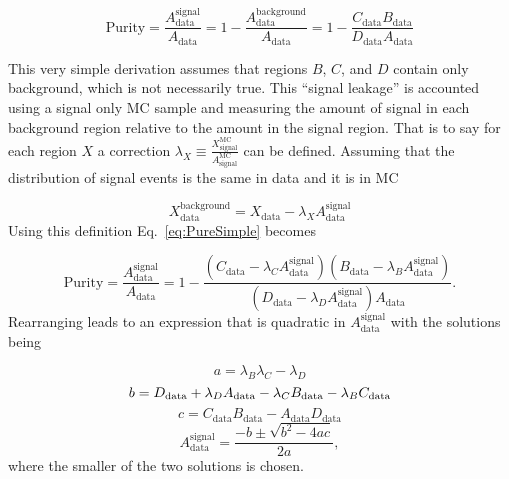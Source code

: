 \begin{equation}
 \label{eq:PureSimple}
 \mathrm{Purity} = \frac{A_{\mathrm{data}}^{\mathrm{signal}}}{A_{\mathrm{data}}} = 1-\frac{A_{\mathrm{data}}^{\mathrm{background}}}{A_{\mathrm{data}}} =1- \frac{C_{\mathrm{data}}B_{\mathrm{data}}}{D_{\mathrm {data}}A_{\mathrm {data}}}
\end{equation}
\noindent

This very simple derivation assumes that regions $B$, $C$, and $D$ contain only background, which is not necessarily true.  
This ``signal leakage'' is accounted using a signal only MC sample and measuring the amount of signal in each background region relative to the amount in the signal region.  
That is to say for each region $X$ a correction $\lambda_X\equiv\frac{X_{\mathrm{signal}}^{\mathrm{MC}}}{A_{\mathrm{signal}}^{\mathrm{MC}}}$ can be defined.  
Assuming that the distribution of signal events is the same in data and it is in MC

\begin{equation}
 X_{\mathrm{data}}^{\mathrm{background}} = X_{\mathrm{data}} - \lambda_XA_{\mathrm{data}}^{\mathrm{signal}}
\end{equation}
\noindent
Using this definition Eq.~\ref{eq:PureSimple} becomes

\begin{equation}
 \label{eq:PureLeakage}
 \mathrm{Purity} = \frac{A_{\mathrm{data}}^{\mathrm{signal}}}{A_{\mathrm{data}}} = 1-\frac{\left(C_{\mathrm{data}}-\lambda_CA_{\mathrm{data}}^{\mathrm{signal}}\right)\left(B_{\mathrm{data}}-\lambda_BA_{\mathrm{data}}^{\mathrm{signal}}\right)}{\left(D_{\mathrm{data}}-\lambda_DA_{\mathrm{data}}^{\mathrm{signal}}\right)A_{\mathrm{data}}}.  
\end{equation}
\noindent
Rearranging leads to an expression that is quadratic in $A_{\mathrm{data}}^{\mathrm{signal}}$ with the solutions being

\begin{equation}
 a=\lambda_B\lambda_C-\lambda_D 
\end{equation}
\begin{equation}
 b=D_{\mathrm{data}}+\lambda_DA_{\mathrm{data}}-\lambda_CB_{\mathrm{data}}-\lambda_BC_{\mathrm{data}} \\
\end{equation}
\begin{equation}
 c=C_{\mathrm{data}}B_{\mathrm{data}}-A_{\mathrm{data}}D_{\mathrm{data}}
\end{equation}
\begin{equation}
 A_{\mathrm{data}}^{\mathrm{signal}} = \frac{-b\pm\sqrt{b^2-4ac}}{2a}, 
\end{equation}
\noindent 
where the smaller of the two solutions is chosen.  

